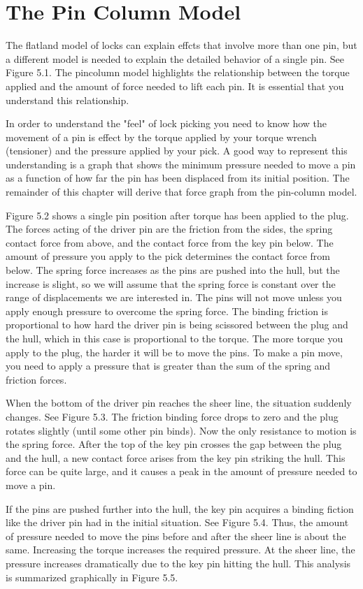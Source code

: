 \chapter{The Pin Column Model}
The flatland model of locks can explain effcts that involve more than one pin, but a different
model is needed to explain the detailed behavior of a single pin. See Figure 5.1. 
The pincolumn model highlights the relationship between the torque applied and the amount of force
needed to lift each pin. It is essential that you understand this relationship.

In order to understand the "feel" of lock picking you need to know how the movement
of a pin is effect by the torque applied by your torque wrench (tensioner) and the pressure
applied by your pick. A good way to represent this understanding is a graph that shows the
minimum pressure needed to move a pin as a function of how far the pin has been displaced
from its initial position. The remainder of this chapter will derive that force graph from the
pin-column model.

Figure 5.2 shows a single pin position after torque has been applied to the plug. The
forces acting of the driver pin are the friction from the sides, the spring contact force from
above, and the contact force from the key pin below. The amount of pressure you apply to
the pick determines the contact force from below.
The spring force increases as the pins are pushed into the hull, but the increase is slight,
so we will assume that the spring force is constant over the range of displacements we
are interested in. The pins will not move unless you apply enough pressure to overcome
the spring force. The binding friction is proportional to how hard the driver pin is being
scissored between the plug and the hull, which in this case is proportional to the torque. The
more torque you apply to the plug, the harder it will be to move the pins. To make a pin
move, you need to apply a pressure that is greater than the sum of the spring and friction
forces.

When the bottom of the driver pin reaches the sheer line, the situation suddenly changes.
See Figure 5.3. The friction binding force drops to zero and the plug rotates slightly (until
some other pin binds). Now the only resistance to motion is the spring force. After the
top of the key pin crosses the gap between the plug and the hull, a new contact force arises
from the key pin striking the hull. This force can be quite large, and it causes a peak in the
amount of pressure needed to move a pin.

If the pins are pushed further into the hull, the key pin acquires a binding fiction like the
driver pin had in the initial situation. See Figure 5.4. Thus, the amount of pressure needed
to move the pins before and after the sheer line is about the same. Increasing the torque
increases the required pressure. At the sheer line, the pressure increases dramatically due to
the key pin hitting the hull. This analysis is summarized graphically in Figure 5.5.
